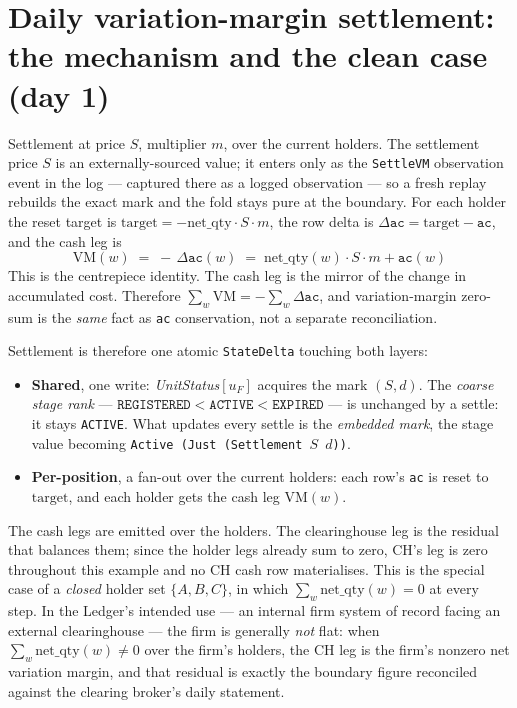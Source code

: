 \documentclass[11pt]{article}
\newcommand{\ac}{\texttt{ac}}
\newcommand{\netq}{\mathrm{net\_qty}}
\newcommand{\code}[1]{\texttt{#1}}
\newcommand{\unit}{u_{F}}
\newcommand{\mult}{m}
\begin{document}
\section{Daily variation-margin settlement: the mechanism and the clean case (day 1)}
\label{sec:settle-mech}

Settlement at price $S$, multiplier $\mult$, over the current holders. The settlement price $S$ is an
externally-sourced value; it enters only as the \code{SettleVM} observation event in the log ---
captured there as a logged observation --- so a fresh replay rebuilds the exact mark and the fold stays
pure at the boundary. For each holder the reset
target is $\mathrm{target}=-\netq\cdot S\cdot\mult$, the row delta is
$\Delta\ac=\mathrm{target}-\ac$, and the cash leg is
\[
\boxed{\;\mathrm{VM}(w) \;=\; -\,\Delta\ac(w) \;=\; \netq(w)\cdot S\cdot \mult + \ac(w)\;}
\]
This is the centrepiece identity. The cash leg is the mirror of the change in accumulated cost.
Therefore $\sum_w\mathrm{VM} = -\sum_w\Delta\ac$, and variation-margin zero-sum is the \emph{same}
fact as \ac{} conservation, not a separate reconciliation.

Settlement is therefore one atomic \code{StateDelta} touching both layers:
\begin{itemize}
\item \textbf{Shared}, one write: \emph{UnitStatus}$[\unit]$ acquires the mark $(S,d)$. The
\emph{coarse stage rank} --- $\code{REGISTERED}<\code{ACTIVE}<\code{EXPIRED}$ --- is unchanged by a
settle: it stays \code{ACTIVE}. What updates every settle is the \emph{embedded mark}, the stage
value becoming \code{Active (Just (Settlement $S$ $d$))}.
\item \textbf{Per-position}, a fan-out over the current holders: each row's \ac{} is reset to
$\mathrm{target}$, and each holder gets the cash leg $\mathrm{VM}(w)$.
\end{itemize}

\noindent The cash legs are emitted over the holders. The clearinghouse leg is the residual that
balances them; since the holder legs already sum to zero, CH's leg is zero throughout this example
and no CH cash row materialises. This is the special case of a \emph{closed} holder set $\{A,B,C\}$, in
which $\sum_w\netq(w)=0$ at every step. In the Ledger's intended use --- an internal firm system of
record facing an external clearinghouse --- the firm is generally \emph{not} flat: when
$\sum_w\netq(w)\ne 0$ over the firm's holders, the CH leg is the firm's nonzero net variation margin,
and that residual is exactly the boundary figure reconciled against the clearing broker's daily
statement.
\end{document}
